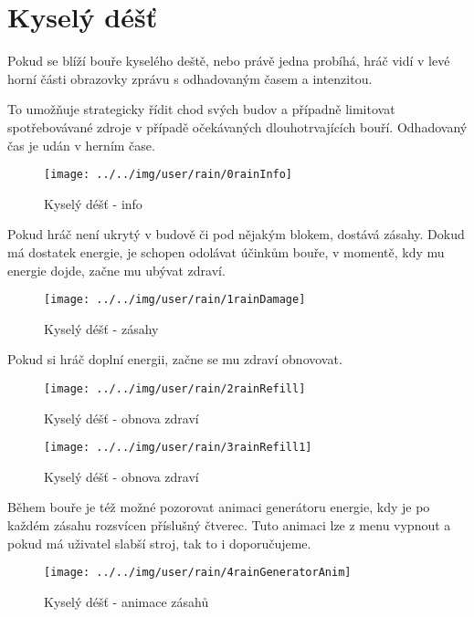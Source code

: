 
\section{Kyselý déšť}

Pokud se blíží bouře kyselého deště, nebo právě jedna probíhá, hráč vidí v levé horní části obrazovky zprávu s odhadovaným časem a intenzitou.

To umožňuje strategicky řídit chod svých budov a případně limitovat spotřebovávané zdroje v případě očekávaných dlouhotrvajících bouří. Odhadovaný čas je udán v herním čase.

\begin{figure}[!ht]\centering
\texttt{[image: ../../img/user/rain/0rainInfo]}

\caption{Kyselý déšť - info}
\label{fig:user_rain_0rainInfo}

\end{figure}

\FloatBarrier

Pokud hráč není ukrytý v budově či pod nějakým blokem, dostává zásahy. Dokud má dostatek energie, je schopen odolávat účinkům bouře, v momentě, kdy mu energie dojde, začne mu ubývat zdraví.


\begin{figure}[!ht]\centering
\texttt{[image: ../../img/user/rain/1rainDamage]}

\caption{Kyselý déšť - zásahy}
\label{fig:user_rain_1rainDamage}

\end{figure}

\FloatBarrier

Pokud si hráč doplní energii, začne se mu zdraví obnovovat.

\begin{figure}[!ht]\centering
\texttt{[image: ../../img/user/rain/2rainRefill]}

\caption{Kyselý déšť - obnova zdraví}
\label{fig:user_rain_2rainRefill}

\end{figure}


\begin{figure}[!ht]\centering
\texttt{[image: ../../img/user/rain/3rainRefill1]}

\caption{Kyselý déšť - obnova zdraví}
\label{fig:user_rain_3rainRefill1}

\end{figure}

\FloatBarrier

Během bouře je též možné pozorovat animaci generátoru energie, kdy je po každém zásahu rozsvícen příslušný čtverec. Tuto animaci lze z menu vypnout a pokud má uživatel slabší stroj, tak to i doporučujeme.

\begin{figure}[!ht]\centering
\texttt{[image: ../../img/user/rain/4rainGeneratorAnim]}

\caption{Kyselý déšť - animace zásahů}
\label{fig:user_rain_4rainGeneratorAnim}

\end{figure}


\FloatBarrier
